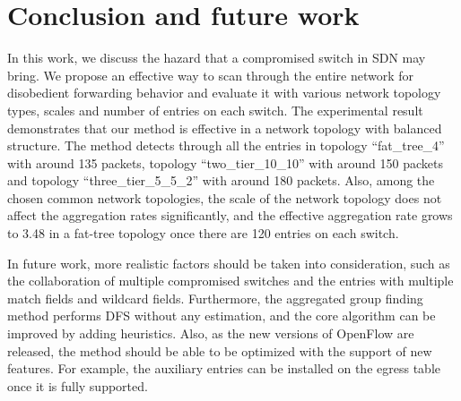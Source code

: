 \chapter{Conclusion and future work}
\label{conclusion}
In this work, we discuss the hazard that a compromised switch in SDN may bring. We propose an effective way to scan through the entire network for disobedient forwarding behavior and evaluate it with various network topology types, scales and number of entries on each switch. The experimental result demonstrates that our method is effective in a network topology with balanced structure. The method detects through all the entries in topology ``fat\_tree\_4'' with around 135 packets, topology ``two\_tier\_10\_10'' with around 150 packets and topology ``three\_tier\_5\_5\_2'' with around 180 packets. Also, among the chosen common network topologies, the scale of the network topology does not affect the aggregation rates significantly, and the effective aggregation rate grows to 3.48 in a fat-tree topology once there are 120 entries on each switch. 

In future work, more realistic factors should be taken into consideration, such as the collaboration of multiple compromised switches and the entries with multiple match fields and wildcard fields. Furthermore, the aggregated group finding method performs DFS without any estimation, and the core algorithm can be improved by adding heuristics. Also, as the new versions of OpenFlow are released, the method should be able to be optimized with the support of new features. For example, the auxiliary entries can be installed on the egress table once it is fully supported.